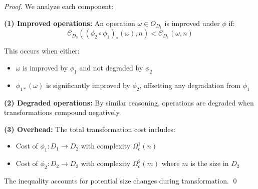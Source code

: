 \documentclass[11pt]{article}
\theoremstyle{definition}
\begin{document}
\begin{proof}
We analyze each component:

\textbf{(1) Improved operations:} An operation $\omega \in O_{D_1}$ is improved under $\phi$ if:
\begin{equation}
\mathcal{C}_{D_3}((\phi_2 \circ \phi_1)_*(\omega), n) < \mathcal{C}_{D_1}(\omega, n)
\end{equation}

This occurs when either:
\begin{itemize}
\item $\omega$ is improved by $\phi_1$ and not degraded by $\phi_2$
\item $\phi_{1*}(\omega)$ is significantly improved by $\phi_2$, offsetting any degradation from $\phi_1$
\end{itemize}

\textbf{(2) Degraded operations:} By similar reasoning, operations are degraded when transformations compound negatively.

\textbf{(3) Overhead:} The total transformation cost includes:
\begin{itemize}
\item Cost of $\phi_1: D_1 \to D_2$ with complexity $\Omega_c^1(n)$
\item Cost of $\phi_2: D_2 \to D_3$ with complexity $\Omega_c^2(m)$ where $m$ is the size in $D_2$
\end{itemize}

The inequality accounts for potential size changes during transformation. \qed
\end{proof}
\end{document}
